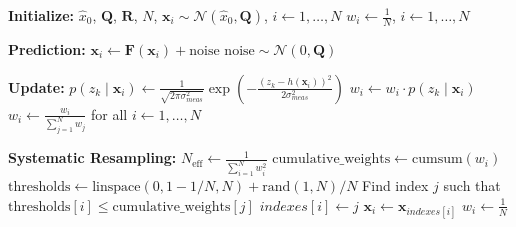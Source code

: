\begin{algorithm}[H]
\caption{Particle Filter Algorithm}
\label{alg:particle_filter}
\begin{algorithmic}[1]
    \vspace{2em}
    \State \textbf{Initialize:}  $\hat{x}_0$,  $\mathbf{Q}$, $\mathbf{R}$, $N$,
    \vspace{0.3em}
    \State $\mathbf{x}_i \sim \mathcal{N}(\hat{x}_0, \mathbf{Q})$, $i \gets 1, \ldots, N$
    \vspace{0.3em}
    \State $w_i \gets \frac{1}{N}$, $i \gets 1, \ldots, N$
    \vspace{1em}
    
    \State \textbf{Prediction:}
    \vspace{1em}
        \State $\mathbf{x}_i \gets \mathbf{F}(\mathbf{x}_i) + \text{noise}$
        \vspace{0.3em}
        \State $\text{noise} \sim \mathcal{N}(0, \mathbf{Q})$
        \vspace{1em}
    \EndFor
    \vspace{1em}
    
    \State \textbf{Update:}
    \vspace{1em}
        \vspace{0.5em}
            \vspace{0.5em}
            \State $p(z_k \mid \mathbf{x}_i) \gets \frac{1}{\sqrt{2 \pi \sigma_{meas}^2}} \exp\left(-\frac{(z_k - h(\mathbf{x}_i))^2}{2 \sigma_{meas}^2}\right)$
            \vspace{0.3em}
            \State $w_i \gets w_i \cdot p(z_k \mid \mathbf{x}_i)$
            \vspace{0.3em}
        \EndFor
        \vspace{0.5em}
        \State $w_i \gets \frac{w_i}{\sum_{j=1}^N w_j}$ for all $i \gets 1, \ldots, N$
    \EndIf
    \vspace{1em}
    
    \State \textbf{Systematic Resampling:}
    \vspace{1em}
    \State $N_{\text{eff}} \gets \frac{1}{\sum_{i=1}^N w_i^2}$
    \vspace{0.5em}
        \vspace{0.5em}
        \State $\text{cumulative\_weights} \gets \text{cumsum}(w_i)$
        \vspace{0.3em}
        \State $\text{thresholds} \gets \text{linspace}(0, 1 - 1/N, N) + \text{rand}(1, N)/N$
        \vspace{0.3em}
            \vspace{0.3em}
            \State Find index $j$ such that $\text{thresholds}[i] \le \text{cumulative\_weights}[j]$
            \vspace{0.3em}
            \State $indexes[i] \gets j$
        \EndFor
        \vspace{0.5em}
        \State $\mathbf{x}_i \gets \mathbf{x}_{indexes[i]}$
        \State $w_i \gets \frac{1}{N}$
    \EndIf
    \vspace{1em}
    

\end{algorithmic}
\end{algorithm}
